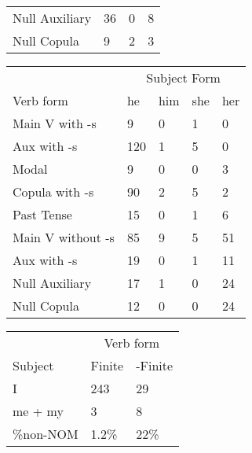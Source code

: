 \begin{table}[!]
\begin{minipage}[t]{0.5\textwidth}
\begin{tabular}{@{}llll@{}}
        \hline
        Null Auxiliary & 36 & 0 & 8 \\
        Null Copula & 9 & 2 & 3 \\
        \bottomrule
    \end{tabular}
\end{minipage}
\vspace{1ex}
\begin{minipage}[t]{0.5\textwidth}
    \centering
    \begin{tabular}{@{}lllll@{}}
        \toprule
            &\multicolumn{4}{c}{Subject Form}\\
            \cline{2-5}
        Verb form & he & him & she & her \\
        \midrule
        Main V with -s & 9 & 0 & 1 & 0 \\
        Aux with -s & 120 & 1 & 5 & 0 \\
        Modal & 9 & 0 & 0 & 3 \\
        Copula with -s & 90 & 2 & 5 & 2 \\
        Past Tense & 15 & 0 & 1 & 6 \\
        \hline
        Main V without -s & 85 & 9 & 5 & 51 \\
        Aux with -s & 19 & 0 & 1 & 11 \\
        Null Auxiliary & 17 & 1 & 0 & 24 \\
        Null Copula & 12 & 0 & 0 & 24 \\
        \bottomrule
    \end{tabular}
\end{minipage}
\vspace{1ex}
   \begin{minipage}[t]{0.5\textwidth}
    \centering
    \begin{tabular}{@{}lll@{}}
        \toprule
         & \multicolumn{2}{c}{Verb form}\\
         \cline{2-3}
        Subject & Finite & -Finite \\
        \midrule
        I & 243 & 29 \\
        me + my & 3 & 8 \\
        \hline
        \%non-NOM & 1.2\% & 22\% \\
        \bottomrule
    \end{tabular}
\end{minipage}
\vspace{1ex}
   \begin{minipage}[t]{0.5\textwidth}

\end{minipage}
\end{table}
